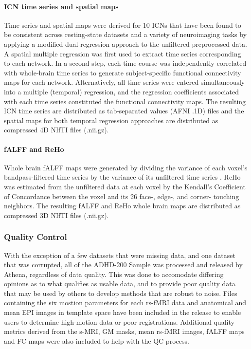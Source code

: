 \documentclass[preprint,12pt,3p]{elsarticle}
\begin{document}
\paragraph{ICN time series and spatial maps} Time series and spatial maps were derived for 10 ICNs that have been found to be consistent across resting-state datasets and a variety of neuroimaging tasks \cite{smith2009correspondence} by applying a modified dual-regression approach \cite{Beckmann2009dualreg} to the unfiltered preprocessed data. A spatial multiple regression was first used to extract time series corresponding to each network. In a second step, each time course was independently correlated with whole-brain time series to generate subject-specific functional connectivity maps for each network. Alternatively, all time series were entered simultaneously into a multiple (temporal) regression, and the regression coefficients associated with each time series constituted the functional connectivity maps. The resulting ICN time series are distributed as tab-separated values (AFNI .1D) files and the spatial maps for both temporal regression approaches are distributed as compressed 4D NIfTI files (.nii.gz).

\paragraph{fALFF and ReHo} Whole brain fALFF maps were generated by dividing the variance of each voxel's bandpass-filtered time series by the variance of its unfiltered time series \cite{zuo2008falff}. ReHo was estimated from the unfiltered data at each voxel by the Kendall's Coefficient of Concordance \cite{kendall1939w} between the voxel and its 26 face-, edge-, and corner- touching neighbors. The resulting fALFF and ReHo whole brain maps are distributed as compressed 3D NIfTI files (.nii.gz).

\subsubsection{Quality Control} 

With the exception of a few datasets that were missing data, and one dataset that was corrupted, all of the ADHD-200 Sample was processed and released by Athena, regardless of data quality. This was done to accomodate differing opinions as to what qualifies as usable data, and to provide poor quality data that may be used by others to develop methods that are robust to noise. Files containing the six mostion parameters for each rs-fMRI data and anatomical and mean EPI images in template space have been included in the release to enable users to determine high-motion data or poor registrations. Additional quality metrics derived from the s-MRI, GM masks, mean rs-fMRI images, fALFF maps and FC maps were also included to help with the QC process. 
 
\end{document}
